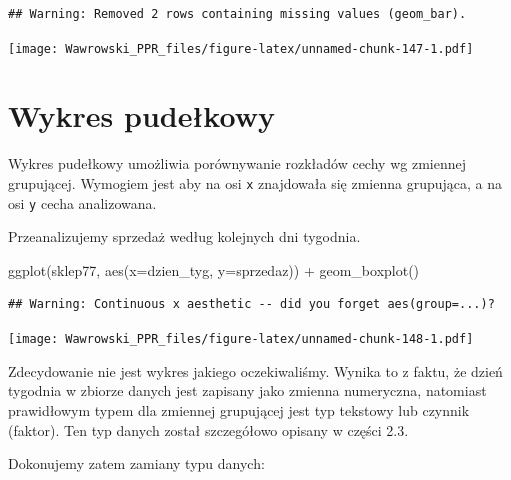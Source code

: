 \documentclass[
]{book}
\newenvironment{Shaded}{\begin{snugshade}}{\end{snugshade}}
\newcommand{\AttributeTok}[1]{\textcolor[rgb]{0.77,0.63,0.00}{#1}}
\newcommand{\FunctionTok}[1]{\textcolor[rgb]{0.00,0.00,0.00}{#1}}
\newcommand{\NormalTok}[1]{#1}
\newcommand{\SpecialCharTok}[1]{\textcolor[rgb]{0.00,0.00,0.00}{#1}}
\begin{document}
\begin{verbatim}
## Warning: Removed 2 rows containing missing values (geom_bar).
\end{verbatim}

\texttt{[image: Wawrowski\_PPR\_files/figure-latex/unnamed-chunk-147-1.pdf]}

\hypertarget{wykres-pudeux142kowy}{%
\section{Wykres pudełkowy}\label{wykres-pudeux142kowy}}

Wykres pudełkowy umożliwia porównywanie rozkładów cechy wg zmiennej grupującej. Wymogiem jest aby na osi \texttt{x} znajdowała się zmienna grupująca, a na osi \texttt{y} cecha analizowana.

Przeanalizujemy sprzedaż według kolejnych dni tygodnia.

\begin{Shaded}
\begin{Highlighting}[]
\FunctionTok{ggplot}\NormalTok{(sklep77, }\FunctionTok{aes}\NormalTok{(}\AttributeTok{x=}\NormalTok{dzien\_tyg, }\AttributeTok{y=}\NormalTok{sprzedaz)) }\SpecialCharTok{+} \FunctionTok{geom\_boxplot}\NormalTok{()}
\end{Highlighting}
\end{Shaded}

\begin{verbatim}
## Warning: Continuous x aesthetic -- did you forget aes(group=...)?
\end{verbatim}

\texttt{[image: Wawrowski\_PPR\_files/figure-latex/unnamed-chunk-148-1.pdf]}

Zdecydowanie nie jest wykres jakiego oczekiwaliśmy. Wynika to z faktu, że dzień tygodnia w zbiorze danych jest zapisany jako zmienna numeryczna, natomiast prawidłowym typem dla zmiennej grupującej jest typ tekstowy lub czynnik (faktor). Ten typ danych został szczegółowo opisany w części 2.3.

Dokonujemy zatem zamiany typu danych:
\end{document}
